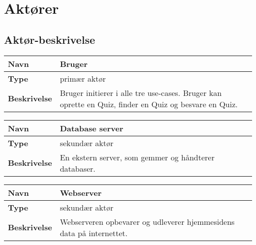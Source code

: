 \section{Aktører}




\subsection{Aktør-beskrivelse}

\begin{tabular}{|p{2cm}|p{12cm}|}

\hline 
\textbf{Navn} & Bruger \\ 
\hline 
\textbf{Type} & primær aktør \\ 
\hline 
\textbf{Beskrivelse} & Bruger initierer i alle tre use-cases. Bruger kan oprette en Quiz, finder en Quiz og besvare en Quiz.\\ 
\hline 

\end{tabular} 

\begin{tabular}{|p{2cm}|p{12cm}|}

\hline 
\textbf{Navn} & Database server \\ 
\hline 
\textbf{Type} & sekundær aktør \\ 
\hline 
\textbf{Beskrivelse} & En ekstern server, som gemmer og håndterer databaser.\\ 
\hline 

\end{tabular} 

\begin{tabular}{|p{2cm}|p{12cm}|}

\hline 
\textbf{Navn} & Webserver \\ 
\hline 
\textbf{Type} & sekundær aktør \\ 
\hline 
\textbf{Beskrivelse} & Webserveren opbevarer og udleverer hjemmesidens data på internettet.\\ 
\hline 

\end{tabular} 